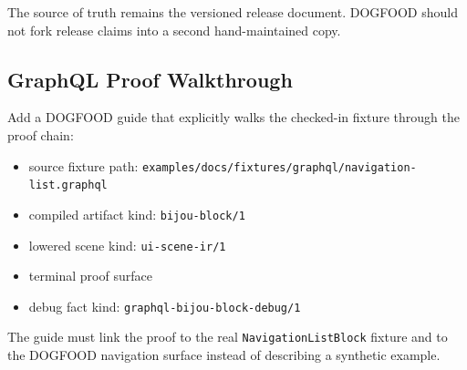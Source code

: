 The source of truth remains the versioned release document. DOGFOOD should not fork release claims into a second hand-maintained copy.

\subsection{GraphQL Proof Walkthrough}\label{record-118-graphql-proof-walkthrough}

Add a DOGFOOD guide that explicitly walks the checked-in fixture through the proof chain:

\begin{itemize}
\tightlist
\item
  source fixture path: \texttt{e\allowbreak{}x\allowbreak{}a\allowbreak{}m\allowbreak{}p\allowbreak{}l\allowbreak{}e\allowbreak{}s\allowbreak{}/\allowbreak{}d\allowbreak{}o\allowbreak{}c\allowbreak{}s\allowbreak{}/\allowbreak{}f\allowbreak{}i\allowbreak{}x\allowbreak{}t\allowbreak{}u\allowbreak{}r\allowbreak{}e\allowbreak{}s\allowbreak{}/\allowbreak{}g\allowbreak{}r\allowbreak{}a\allowbreak{}p\allowbreak{}h\allowbreak{}q\allowbreak{}l\allowbreak{}/\allowbreak{}n\allowbreak{}a\allowbreak{}v\allowbreak{}i\allowbreak{}g\allowbreak{}a\allowbreak{}t\allowbreak{}i\allowbreak{}o\allowbreak{}n\allowbreak{}-\allowbreak{}l\allowbreak{}i\allowbreak{}s\allowbreak{}t\allowbreak{}.\allowbreak{}g\allowbreak{}r\allowbreak{}a\allowbreak{}p\allowbreak{}h\allowbreak{}q\allowbreak{}l}
\item
  compiled artifact kind: \texttt{b\allowbreak{}i\allowbreak{}j\allowbreak{}o\allowbreak{}u\allowbreak{}-\allowbreak{}b\allowbreak{}l\allowbreak{}o\allowbreak{}c\allowbreak{}k\allowbreak{}/\allowbreak{}1}
\item
  lowered scene kind: \texttt{u\allowbreak{}i\allowbreak{}-\allowbreak{}s\allowbreak{}c\allowbreak{}e\allowbreak{}n\allowbreak{}e\allowbreak{}-\allowbreak{}i\allowbreak{}r\allowbreak{}/\allowbreak{}1}
\item
  terminal proof surface
\item
  debug fact kind: \texttt{g\allowbreak{}r\allowbreak{}a\allowbreak{}p\allowbreak{}h\allowbreak{}q\allowbreak{}l\allowbreak{}-\allowbreak{}b\allowbreak{}i\allowbreak{}j\allowbreak{}o\allowbreak{}u\allowbreak{}-\allowbreak{}b\allowbreak{}l\allowbreak{}o\allowbreak{}c\allowbreak{}k\allowbreak{}-\allowbreak{}d\allowbreak{}e\allowbreak{}b\allowbreak{}u\allowbreak{}g\allowbreak{}/\allowbreak{}1}
\end{itemize}

The guide must link the proof to the real \texttt{N\allowbreak{}a\allowbreak{}v\allowbreak{}i\allowbreak{}g\allowbreak{}a\allowbreak{}t\allowbreak{}i\allowbreak{}o\allowbreak{}n\allowbreak{}L\allowbreak{}i\allowbreak{}s\allowbreak{}t\allowbreak{}B\allowbreak{}l\allowbreak{}o\allowbreak{}c\allowbreak{}k} fixture and to the DOGFOOD navigation surface instead of describing a synthetic example.

